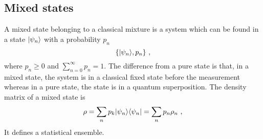 \subsection{Mixed states}

    A mixed state belonging to a classical mixture is a system which can be found in a state $\vert\psi_n\rangle$ with a probability $p_n$
    \begin{equation*}
        \{\vert\psi_n\rangle, p_n\} ~,
    \end{equation*}
    where $p_n \geq 0$ and $\sum_{n=0}^{\infty} p_n = 1$. The difference from a pure state is that, in a mixed state, the system is in a classical fixed state before the measurement whereas in a pure state, the state is in a quantum superposition. The density matrix of a mixed state is 
    \begin{equation*}
        \rho = \sum_n p_k \vert\psi_n\rangle \langle\psi_n\vert = \sum_n p_n \rho_n ~,
    \end{equation*}
    It defines a statistical ensemble. 

